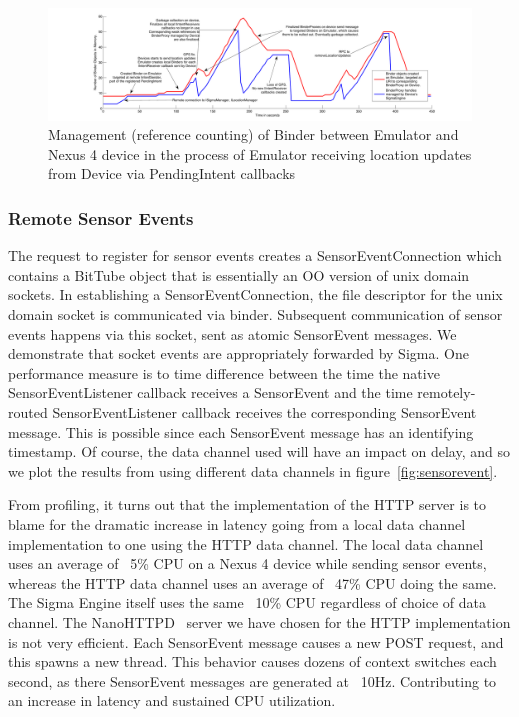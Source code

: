 \documentclass[prodmode]{acmlarge}
\begin{document}
\begin{figure}[h]
\centering
\includegraphics[width=\textwidth]{plots/location_sharing_reference_counting.pdf}
\caption{Management (reference counting) of Binder between Emulator and Nexus 4 device in the process of Emulator receiving location updates from Device via PendingIntent callbacks}
\label{fig:reference_counting}
\end{figure}

\subsubsection{Remote Sensor Events}
\label{sec:sensorevent}
The request to register for sensor events creates a SensorEventConnection which contains a BitTube object that is essentially an OO version of unix domain sockets. In establishing a SensorEventConnection, the file descriptor for the unix domain socket is communicated via binder. Subsequent communication of sensor events happens via this socket, sent as atomic SensorEvent messages. We demonstrate that socket events are appropriately forwarded by Sigma. One performance measure is to time difference between the time the native SensorEventListener callback receives a SensorEvent and the time remotely-routed SensorEventListener callback receives the corresponding SensorEvent message. This is possible since each SensorEvent message has an identifying timestamp. Of course, the data channel used will have an impact on delay, and so we plot the results from using different data channels in figure~\ref{fig:sensorevent}.

From profiling, it turns out that the implementation of the HTTP server is to blame for the dramatic increase in latency going from a local data channel implementation to one using the HTTP data channel. The local data channel uses an average of ~5\% CPU on a Nexus 4 device while sending sensor events, whereas the HTTP data channel uses an average of ~47\% CPU doing the same. The Sigma Engine itself uses the same ~10\% CPU regardless of choice of data channel. The NanoHTTPD~\cite{NanoHttpd} server we have chosen for the HTTP implementation is not very efficient. Each SensorEvent message causes a new POST request, and this spawns a new thread. This behavior causes dozens of context switches each second, as there SensorEvent messages are generated at ~10Hz. Contributing to an increase in latency and sustained CPU utilization.
\end{document}
